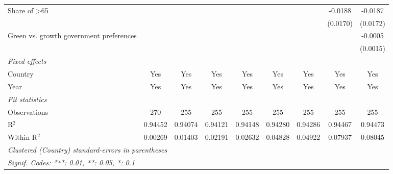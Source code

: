 \begin{table}[htbp]
\begin{tabular}{lcccccccc}
      Share of >65                            &          &          &          &          &          &          & -0.0188  & -0.0187\\   
                                              &          &          &          &          &          &          & (0.0170) & (0.0172)\\   
      Green vs. growth government preferences &          &          &          &          &          &          &          & -0.0005\\   
                                              &          &          &          &          &          &          &          & (0.0015)\\   
      \midrule
      \emph{Fixed-effects}\\
      Country                                 & Yes      & Yes      & Yes      & Yes      & Yes      & Yes      & Yes      & Yes\\  
      Year                                    & Yes      & Yes      & Yes      & Yes      & Yes      & Yes      & Yes      & Yes\\  
      \midrule
      \emph{Fit statistics}\\
      Observations                            & 270      & 255      & 255      & 255      & 255      & 255      & 255      & 255\\  
      R$^2$                                   & 0.94452  & 0.94074  & 0.94121  & 0.94148  & 0.94280  & 0.94286  & 0.94467  & 0.94473\\  
      Within R$^2$                            & 0.00269  & 0.01403  & 0.02191  & 0.02632  & 0.04828  & 0.04922  & 0.07937  & 0.08045\\  
      \midrule \midrule
      \multicolumn{9}{l}{\emph{Clustered (Country) standard-errors in parentheses}}\\
      \multicolumn{9}{l}{\emph{Signif. Codes: ***: 0.01, **: 0.05, *: 0.1}}\\
   \end{tabular}
\end{table}


